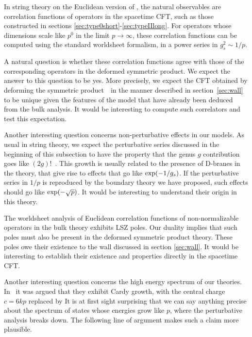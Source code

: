 \documentclass[12pt]{article}
\numberwithin{equation}{section}
\def\exp{{\rm exp}}
\begin{document}
In string theory on the Euclidean version of \ourads, the natural observables are correlation functions of operators in the spacetime CFT, such as those constructed in sections \ref{sec:type0short}-\ref{sec:typeIIlong}. For operators whose dimensions scale like $p^0$ in the limit $p\to\infty$, these correlation functions can be computed using the standard worldsheet formalism, in a power series in $g_s^2\sim 1/p$. 

A natural question is whether these correlation functions agree with those of the corresponding operators in the deformed symmetric product.  We expect the answer to this question to be yes.  More precisely, we expect the CFT obtained by deforming the symmetric product~\ourcft\ in the manner described in section~\ref{sec:wall} to be unique given the features of the model that have already been deduced from the bulk analysis. It would be interesting to compute such correlators and test this expectation. 

Another interesting question concerns non-perturbative effects in our models. As usual in string theory, we expect the perturbative series discussed in the beginning of this subsection to have the property that the genus $g$ contribution goes like $(2g)!$~.  This growth is usually related to the presence of D-branes in the theory, that give rise to effects that go like $\exp(-1/g_s)$. If the perturbative series in $1/p$ is reproduced by the boundary theory we have proposed, such effects should go like $\exp(-\sqrt p)$. It would be interesting to understand their origin in this theory. 


The worldsheet analysis of Euclidean correlation functions of non-normalizable operators in the bulk theory exhibits LSZ poles.  Our duality implies that such poles must also be present in the deformed symmetric product theory.  These poles owe their existence to the wall discussed in section \ref{sec:wall}.  It would be interesting to establish their existence and properties directly in the spacetime CFT. 

Another interesting question concerns the high energy spectrum of our theories. In~ it was argued that they exhibit Cardy growth, with the central charge $c=6kp$ replaced by 
It is at first sight surprising that we can say anything precise about the spectrum of states whose energies grow like $p$, where the perturbative analysis breaks down. The following line of argument makes such a claim more plausible.
\end{document}
